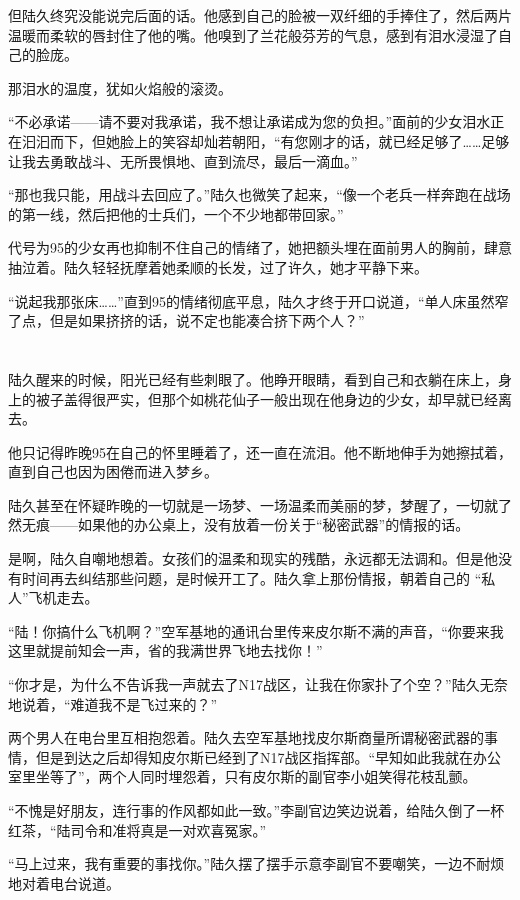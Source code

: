 但陆久终究没能说完后面的话。他感到自己的脸被一双纤细的手捧住了，然后两片温暖而柔软的唇封住了他的嘴。他嗅到了兰花般芬芳的气息，感到有泪水浸湿了自己的脸庞。

那泪水的温度，犹如火焰般的滚烫。

“不必承诺——请不要对我承诺，我不想让承诺成为您的负担。”面前的少女泪水正在汩汩而下，但她脸上的笑容却灿若朝阳，“有您刚才的话，就已经足够了……足够让我去勇敢战斗、无所畏惧地、直到流尽，最后一滴血。”

“那也我只能，用战斗去回应了。”陆久也微笑了起来，“像一个老兵一样奔跑在战场的第一线，然后把他的士兵们，一个不少地都带回家。”

代号为95的少女再也抑制不住自己的情绪了，她把额头埋在面前男人的胸前，肆意抽泣着。陆久轻轻抚摩着她柔顺的长发，过了许久，她才平静下来。

“说起我那张床……”直到95的情绪彻底平息，陆久才终于开口说道，“单人床虽然窄了点，但是如果挤挤的话，说不定也能凑合挤下两个人？”
\section*{}

陆久醒来的时候，阳光已经有些刺眼了。他睁开眼睛，看到自己和衣躺在床上，身上的被子盖得很严实，但那个如桃花仙子一般出现在他身边的少女，却早就已经离去。

他只记得昨晚95在自己的怀里睡着了，还一直在流泪。他不断地伸手为她擦拭着，直到自己也因为困倦而进入梦乡。

陆久甚至在怀疑昨晚的一切就是一场梦、一场温柔而美丽的梦，梦醒了，一切就了然无痕——如果他的办公桌上，没有放着一份关于“秘密武器”的情报的话。

是啊，陆久自嘲地想着。女孩们的温柔和现实的残酷，永远都无法调和。但是他没有时间再去纠结那些问题，是时候开工了。陆久拿上那份情报，朝着自己的 “私人”飞机走去。

“陆！你搞什么飞机啊？”空军基地的通讯台里传来皮尔斯不满的声音，“你要来我这里就提前知会一声，省的我满世界飞地去找你！”

“你才是，为什么不告诉我一声就去了N17战区，让我在你家扑了个空？”陆久无奈地说着，“难道我不是飞过来的？”

两个男人在电台里互相抱怨着。陆久去空军基地找皮尔斯商量所谓秘密武器的事情，但是到达之后却得知皮尔斯已经到了N17战区指挥部。“早知如此我就在办公室里坐等了”，两个人同时埋怨着，只有皮尔斯的副官李小姐笑得花枝乱颤。

“不愧是好朋友，连行事的作风都如此一致。”李副官边笑边说着，给陆久倒了一杯红茶，“陆司令和准将真是一对欢喜冤家。”

“马上过来，我有重要的事找你。”陆久摆了摆手示意李副官不要嘲笑，一边不耐烦地对着电台说道。

